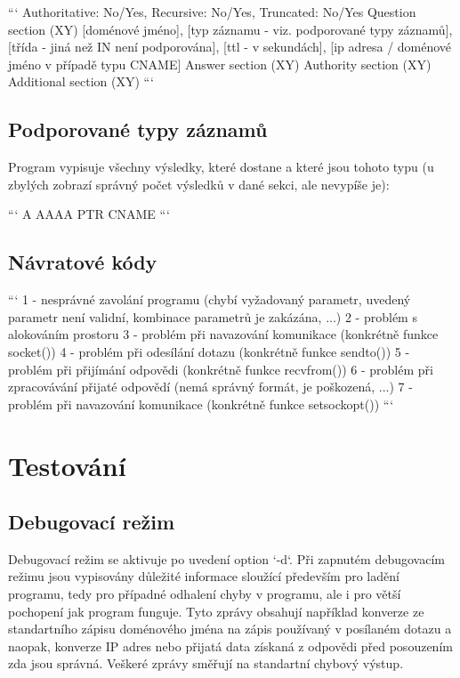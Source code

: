 \documentclass[a4paper,11pt]{article}
\begin{document}
```
Authoritative: No/Yes, Recursive: No/Yes, Truncated: No/Yes
Question section (XY)
  [doménové jméno], [typ záznamu - viz. podporované typy záznamů], [třída - jiná než IN není podporována], [ttl - v sekundách], [ip adresa / doménové jméno v případě typu CNAME]
Answer section (XY)
Authority section (XY)
Additional section (XY)
```

\subsection{Podporované typy záznamů}

Program vypisuje všechny výsledky, které dostane a které jsou tohoto typu (u zbylých zobrazí správný počet výsledků v dané sekci, ale nevypíše je):

```
A
AAAA
PTR
CNAME
```

\subsection{Návratové kódy}

```
1 - nesprávné zavolání programu (chybí vyžadovaný parametr, uvedený parametr není validní, kombinace parametrů je zakázána, ...)
2 - problém s alokováním prostoru
3 - problém při navazování komunikace (konkrétně funkce socket())
4 - problém při odesílání dotazu (konkrétně funkce sendto()) 
5 - problém při přijímání odpovědi (konkrétně funkce recvfrom()) 
6 - problém při zpracovávání přijaté odpovědí (nemá správný formát, je poškozená, ...)
7 - problém při navazování komunikace (konkrétně funkce setsockopt())
```

\section{Testování}

\subsection{Debugovací režim}

Debugovací režim se aktivuje po uvedení option `-d`. Při zapnutém debugovacím režimu jsou vypisovány důležité informace sloužící především pro ladění programu, tedy pro případné odhalení chyby v programu, ale i pro větší pochopení jak program funguje. Tyto zprávy obsahují například konverze ze standartního zápisu doménového jména na zápis používaný v posílaném dotazu a naopak, konverze IP adres nebo přijatá data získaná z odpovědi před posouzením zda jsou správná. Veškeré zprávy směřují na standartní chybový výstup.
\end{document}
